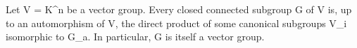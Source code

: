 Let V = K^n be a vector group. Every closed connected subgroup G of V is, up to an automorphism of V, the direct product of some canonical subgroups V_i isomorphic to G_a. In particular, G is itself a vector group.
